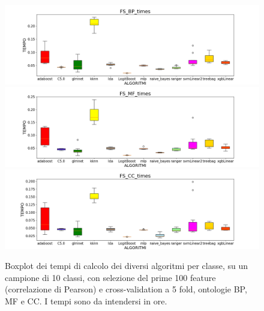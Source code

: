 \documentclass[12pt]{report}
\begin{document}
\begin{figure}[hp!]
\includegraphics[scale=0.37]{./images/FS_BP_times.png}
\includegraphics[scale=0.37]{./images/FS_MF_times.png}
\includegraphics[scale=0.37]{./images/FS_CC_times.png}
\caption{\footnotesize{Boxplot dei tempi di calcolo dei diversi algoritmi per classe, su un campione di 10 classi, con selezione del prime 100 feature (correlazione di Pearson) e cross-validation a 5 fold, ontologie BP, MF e CC. I tempi sono da intendersi in ore.}}
\label{BPMFCCboxplotFStimes}
\end{figure}
\end{document}
